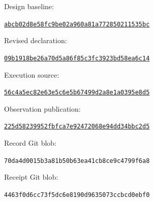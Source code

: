 \noindent Design baseline:\par
{\footnotesize\href{https://github.com/gutama/clifford_qc/commit/abcb02d8e58fc9be02a960a81a772850211535bc}{\texttt{abcb02d8e58fc9be02a960a81a772850211535bc}}}\par\smallskip
\noindent Revised declaration:\par
{\footnotesize\href{https://github.com/gutama/clifford_qc/commit/09b1918be26a70d5a86f85c3fc3923bd58ea6c14}{\texttt{09b1918be26a70d5a86f85c3fc3923bd58ea6c14}}}\par\smallskip
\noindent Execution source:\par
{\footnotesize\href{https://github.com/gutama/clifford_qc/commit/56c4a5ec82e63e5c6e5b67499d2a8e1a0395e8d5}{\texttt{56c4a5ec82e63e5c6e5b67499d2a8e1a0395e8d5}}}\par\smallskip
\noindent Observation publication:\par
{\footnotesize\href{https://github.com/gutama/clifford_qc/commit/225d58239952fbfca7e92472068e94dd34bbc2d5}{\texttt{225d58239952fbfca7e92472068e94dd34bbc2d5}}}\par\smallskip
\noindent Record Git blob:\par
{\footnotesize\texttt{70da4d0015b3a81b50b63ea41cb8ce9c4799f6a8}}\par\smallskip
\noindent Receipt Git blob:\par
{\footnotesize\texttt{4463f0d6cc73f5dc6e8190d9635073ccbcd0ebf0}}\par\smallskip
